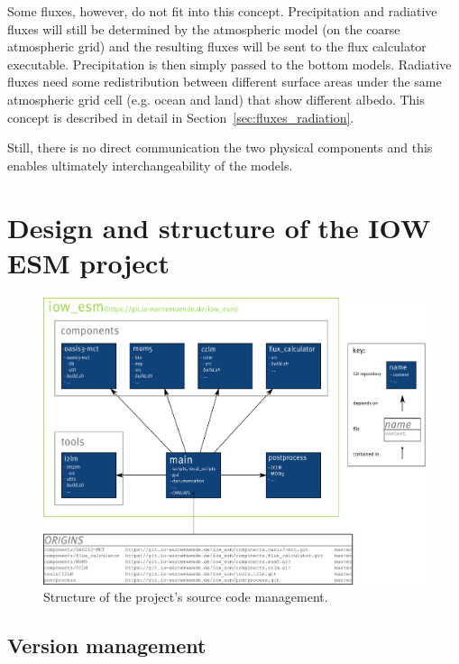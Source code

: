 \documentclass[a4paper,titlepage]{scrartcl}
\begin{document}
Some fluxes, however, do not fit into this concept. Precipitation and radiative fluxes will still be determined by the atmospheric model (on the coarse atmospheric grid) and the resulting fluxes will be sent to the flux calculator executable. Precipitation is then simply passed to the bottom models. Radiative fluxes need some redistribution between different surface areas under the same atmospheric grid cell (e.g. ocean and land) that show different albedo. This concept is described in detail in Section~\ref{sec:fluxes_radiation}.

Still, there is no direct communication the two physical components and this enables ultimately interchangeability of the models.

\newpage
\section{Design and structure of the IOW ESM project}

\begin{figure}[H]
	\centering
	\includegraphics[width=\linewidth]{"./figures/project_structure.pdf"} 
	\caption{Structure of the project's source code management.}
\end{figure}

\subsection{Version management}
\end{document}
